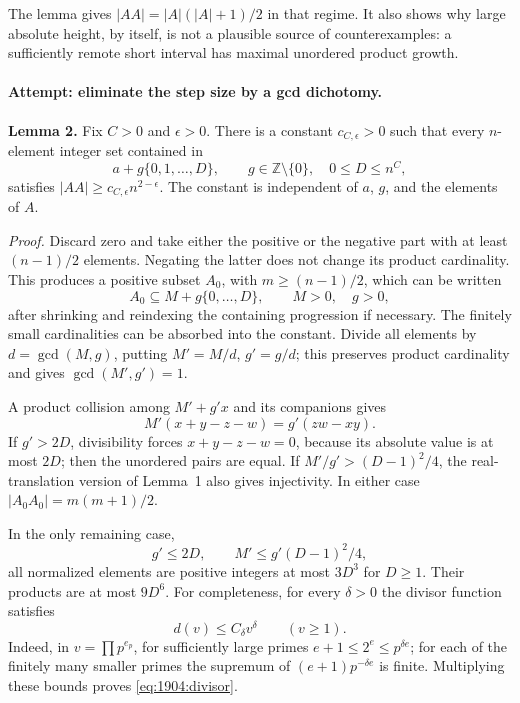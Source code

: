 \documentclass[11pt,a4paper]{article}
\newcommand{\Z}{\mathbb{Z}}
\numberwithin{equation}{section}
\begin{document}
The lemma gives $|AA|=|A|(|A|+1)/2$ in that regime. It also shows why
large absolute height, by itself, is not a plausible source of
counterexamples: a sufficiently remote short interval has maximal
unordered product growth.

\paragraph{Attempt: eliminate the step size by a gcd dichotomy.}
\textbf{Lemma 2.} Fix $C>0$ and $\epsilon>0$. There is a constant
$c_{C,\epsilon}>0$ such that every $n$-element integer set contained in
\[
 a+g\{0,1,\ldots,D\},\qquad g\in\Z\setminus\{0\},\quad
 0\leq D\leq n^C,
\]
satisfies $|AA|\geq c_{C,\epsilon}n^{2-\epsilon}$.
The constant is independent of $a$, $g$, and the elements of $A$.

\emph{Proof.} Discard zero and take either the positive or the negative
part with at least $(n-1)/2$ elements. Negating the latter does not change
its product cardinality. This produces a positive subset $A_0$, with
$m\geq(n-1)/2$, which can be written
\[
 A_0\subseteq M+g\{0,\ldots,D\},\qquad M>0,\quad g>0,
\]
after shrinking and reindexing the containing progression if necessary.
The finitely small cardinalities can be absorbed into the constant.
Divide all elements by $d=\gcd(M,g)$, putting $M'=M/d$, $g'=g/d$;
this preserves product cardinality and gives $\gcd(M',g')=1$.

A product collision among $M'+g'x$ and its companions gives
\begin{equation}\label{eq:1904:divisibility}
 M'(x+y-z-w)=g'(zw-xy).
\end{equation}
If $g'>2D$, divisibility forces $x+y-z-w=0$, because its absolute value
is at most $2D$; then the unordered pairs are equal. If
$M'/g'>(D-1)^2/4$, the real-translation version of Lemma~1 also gives
injectivity. In either case $|A_0A_0|=m(m+1)/2$.

In the only remaining case,
\[
 g'\leq2D,\qquad M'\leq g'(D-1)^2/4,
\]
all normalized elements are positive integers at most $3D^3$ for $D\geq1$.
Their products are at most $9D^6$. For completeness, for every $\delta>0$
the divisor function satisfies
\begin{equation}\label{eq:1904:divisor}
 d(v)\leq C_\delta v^\delta\qquad(v\geq1).
\end{equation}
Indeed, in $v=\prod p^{e_p}$, for sufficiently large primes
$e+1\leq2^e\leq p^{\delta e}$; for each of the finitely many smaller
primes the supremum of $(e+1)p^{-\delta e}$ is finite. Multiplying these
bounds proves \eqref{eq:1904:divisor}.
\end{document}
